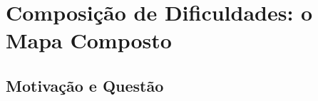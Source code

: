 %
%
%
%
%

\providecommand{\PORPREENCHER}[1]{\textcolor{red}{\emph{[POR PREENCHER: #1]}}}

\section{Composição de Dificuldades: o Mapa Composto}
\label{sec:res_mapa_grande}

\subsection{Motivação e Questão}

